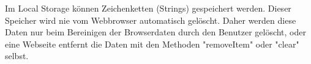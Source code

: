 \label{sec:localstorage}

Im Local Storage können Zeichenketten (Strings) gespeichert werden. 
Dieser Speicher wird nie vom Webbrowser automatisch gelöscht. 
Daher werden diese Daten nur beim Bereinigen der Browserdaten durch den Benutzer gelöscht, oder eine Webseite entfernt die Daten mit den Methoden "{\ttfamily removeItem}" oder "{\ttfamily clear}" selbst. 
\cite{w3LocalStorage}

